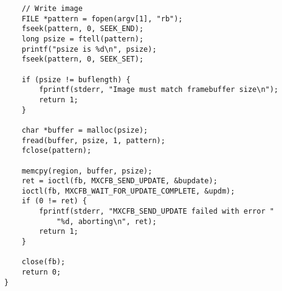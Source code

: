 \documentclass{memoir}
\begin{document}
\begin{verbatim}
	// Write image
	FILE *pattern = fopen(argv[1], "rb");
	fseek(pattern, 0, SEEK_END);
	long psize = ftell(pattern);
	printf("psize is %d\n", psize);
	fseek(pattern, 0, SEEK_SET);
	
	if (psize != buflength) {
		fprintf(stderr, "Image must match framebuffer size\n");
		return 1;
	}

	char *buffer = malloc(psize);
	fread(buffer, psize, 1, pattern);
	fclose(pattern);

	memcpy(region, buffer, psize);
	ret = ioctl(fb, MXCFB_SEND_UPDATE, &bupdate);
	ioctl(fb, MXCFB_WAIT_FOR_UPDATE_COMPLETE, &updm);
	if (0 != ret) {
		fprintf(stderr, "MXCFB_SEND_UPDATE failed with error "
			"%d, aborting\n", ret);
		return 1;
	}

	close(fb);
	return 0;
}

\end{verbatim}
\end{document}
